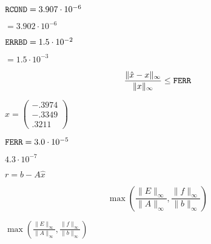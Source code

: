 {\newpage\clearpage
{}%
${\tt RCOND} = 3.907 \cdot 10^{-6}$%
\lthtmlinlinemathZ
\lthtmlcheckvsize\clearpage}

{\newpage\clearpage
{}%
$= 3.902 \cdot 10^{-6}$%
\lthtmlinlinemathZ
\lthtmlcheckvsize\clearpage}

{\newpage\clearpage
{}%
${\tt ERRBD} =  1.5 \cdot 10^{-2}$%
\lthtmlinlinemathZ
\lthtmlcheckvsize\clearpage}

{\newpage\clearpage
{}%
$= 1.5 \cdot 10^{-3}$%
\lthtmlinlinemathZ
\lthtmlcheckvsize\clearpage}

{\newpage\clearpage
{}%
\begin{displaymath}
\frac{\| \hat{x} - x \|_{\infty}}{\|x\|_{\infty}} \leq {\tt FERR}
\end{displaymath}%
\lthtmldisplayZ
\lthtmlcheckvsize\clearpage}

{\newpage\clearpage
{}%
$\hat{x} = \left( \begin{array}{c} -.3974 \\-.3349 \\.3211 \end{array} \right) $%
\lthtmlinlinemathZ
\lthtmlcheckvsize\clearpage}

{\newpage\clearpage
{}%
${\tt FERR} = 3.0 \cdot 10^{-5}$%
\lthtmlinlinemathZ
\lthtmlcheckvsize\clearpage}

{\newpage\clearpage
{}%
$4.3 \cdot 10^{-7}$%
\lthtmlinlinemathZ
\lthtmlcheckvsize\clearpage}

{\newpage\clearpage
{}%
$r = b - A \hat{x}$%
\lthtmlinlinemathZ
\lthtmlcheckvsize\clearpage}

{\newpage\clearpage
{}%
\begin{displaymath}
\max \left( \frac{\| E \|_{\infty}}{\| A \|_{\infty}} ,
            \frac{\| f \|_{\infty}}{\| b \|_{\infty}} \right)
\end{displaymath}%
\lthtmldisplayZ
\lthtmlcheckvsize\clearpage}

{\newpage\clearpage
{}%
$\max \left( \frac{\| E \|_{\infty}}{\| A \|_{\infty}} ,
\frac{\| f \|_{\infty}}{\| b \|_{\infty}} \right)$%
\lthtmlinlinemathZ
\lthtmlcheckvsize\clearpage}

